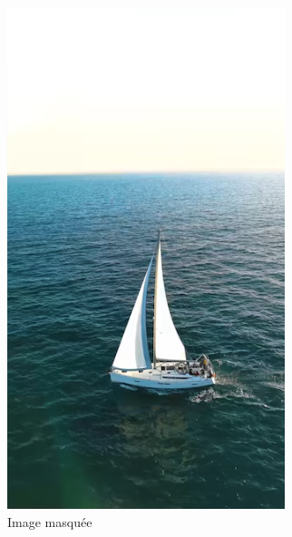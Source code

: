 \documentclass[10pt]{article}
\begin{document}
\begin{figure}[h]
    \centering
    \begin{subfigure}{0.3\textwidth}
        \centering
        \includegraphics[width=\textwidth]{images/sailboat.png}
        \caption{Image masquée}
    \end{subfigure}
    \hspace{0.05\textwidth} 
    \begin{subfigure}{0.3\textwidth}

\end{subfigure}
\end{figure}
\end{document}
